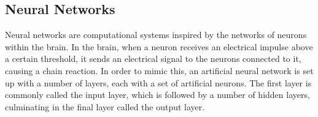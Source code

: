 \documentclass{article}
\theoremstyle{definition}
\begin{document}
\subsection{Neural Networks}

Neural networks are computational systems inspired by the networks of neurons within the brain. In the brain, when a neuron receives an electrical impulse above a certain threshold, it sends an electrical signal to the neurons connected to it, causing a chain reaction. In order to mimic this, an artificial neural network is set up with a number of layers, each with a set of artificial neurons. The first layer is commonly called the input layer, which is followed by a number of hidden layers, culminating in the final layer called the output layer.
\end{document}
